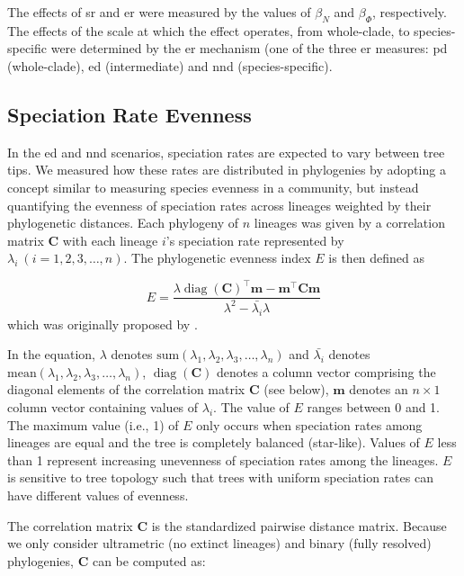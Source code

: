 {The effects of \acrshort{sr} and \acrshort{er} were measured by the values of $\beta_N$ and $\beta_\varPhi$, respectively. The effects of the scale at which the effect operates, from whole-clade, to species-specific were determined by the \acrshort{er} mechanism (one of the three \acrshort{er} measures: \acrshort{pd} (whole-clade), \acrshort{ed} (intermediate) and \acrshort{nnd} (species-specific).

\subsection{Speciation Rate Evenness}
\label{ch1::sec::methods::spec-rate-evenness}
In the \acrshort{ed} and \acrshort{nnd} scenarios, speciation rates are expected to vary between tree tips. We measured how these rates are distributed in phylogenies by adopting a concept similar to measuring species evenness in a community, but instead quantifying the evenness of speciation rates across lineages weighted by their phylogenetic distances. Each phylogeny of $n$ lineages was given by a correlation matrix $\boldsymbol{C}$ with each lineage $i$'s speciation rate represented by $\lambda_{i}\ (i=1,2,3,\ldots,n)$. The phylogenetic evenness index $E$ is then defined as

\begin{equation}
    E=\frac{\lambda\operatorname{diag}(\boldsymbol{C})^{\top}\boldsymbol{m}-\boldsymbol{m}^{\top}\boldsymbol{C}\boldsymbol{m}}{\lambda^2-\bar{\lambda_i}\lambda}
\label{equation:nine}
\end{equation}
which was originally proposed by \citet{helmus_phylogenetic_2007}. 

In the equation, $\lambda$ denotes $\text{sum}(\lambda_1,\lambda_2,\lambda_3,\ldots,\lambda_n)$ and $\bar{\lambda_i}$ denotes $\text{mean}(\lambda_1,\lambda_2,\lambda_3,\ldots,\lambda_n)$, $\operatorname{diag}(\boldsymbol{C})$ denotes a column vector comprising the diagonal elements of the correlation matrix $\boldsymbol{C}$ (see below), $\boldsymbol{m}$ denotes an $n\times1$ column vector containing values of $\lambda_i$. The value of $E$ ranges between 0 and 1. The maximum value (i.e., 1) of $E$ only occurs when speciation rates among lineages are equal and the tree is completely balanced (star-like). Values of $E$ less than 1 represent increasing unevenness of speciation rates among the lineages. $E$ is sensitive to tree topology such that trees with uniform speciation rates can have different values of evenness.

The correlation matrix $\boldsymbol{C}$ is the standardized pairwise distance matrix. Because we only consider ultrametric (no extinct lineages) and binary (fully resolved) phylogenies, $\boldsymbol{C}$ can be computed as:

}
